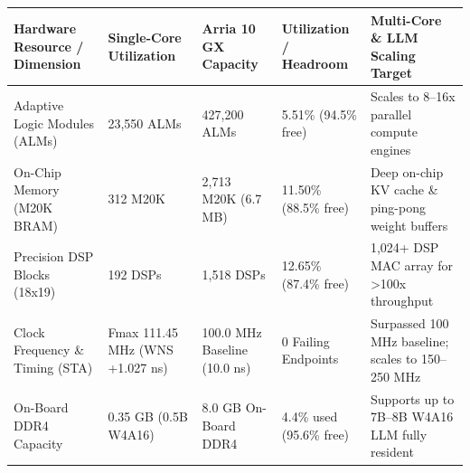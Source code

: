 \documentclass[11pt,a4paper]{article}
\begin{document}
{\footnotesize\renewcommand{\arraystretch}{1.14}\begin{longtable}{@{}L{0.21\textwidth}L{0.16\textwidth}L{0.16\textwidth}L{0.15\textwidth}L{0.22\textwidth}@{}}\toprule

\textbf{Hardware Resource /\allowbreak{} Dimension} & \textbf{Single-Core Utilization} & \textbf{Arria 10 GX Capacity} & \textbf{Utilization /\allowbreak{} Headroom} & \textbf{Multi-Core \& LLM Scaling Target}\\\midrule\endhead

Adaptive Logic Modules (\allowbreak{}ALMs)\allowbreak{} & 23,\allowbreak{}550 ALMs & 427,\allowbreak{}200 ALMs & 5.51\% (\allowbreak{}94.5\% free)\allowbreak{} & Scales to 8--16x parallel compute engines\\[2pt]

On-Chip Memory (\allowbreak{}M20K BRAM)\allowbreak{} & 312 M20K & 2,\allowbreak{}713 M20K (\allowbreak{}6.7 MB)\allowbreak{} & 11.50\% (\allowbreak{}88.5\% free)\allowbreak{} & Deep on-chip KV cache \& ping-pong weight buffers\\[2pt]

Precision DSP Blocks (\allowbreak{}18x19)\allowbreak{} & 192 DSPs & 1,\allowbreak{}518 DSPs & 12.65\% (\allowbreak{}87.4\% free)\allowbreak{} & 1,\allowbreak{}024+\allowbreak{} DSP MAC array for >100x throughput\\[2pt]

Clock Frequency \& Timing (\allowbreak{}STA)\allowbreak{} & Fmax 111.45 MHz (\allowbreak{}WNS +\allowbreak{}1.027 ns)\allowbreak{} & 100.0 MHz Baseline (\allowbreak{}10.0 ns)\allowbreak{} & 0 Failing Endpoints & Surpassed 100 MHz baseline; scales to 150--250 MHz\\[2pt]

On-Board DDR4 Capacity & 0.35 GB (\allowbreak{}0.5B W4A16)\allowbreak{} & 8.0 GB On-Board DDR4 & 4.4\% used (\allowbreak{}95.6\% free)\allowbreak{} & Supports up to 7B--8B W4A16 LLM fully resident\\[2pt]

\bottomrule\end{longtable}}
\end{document}
